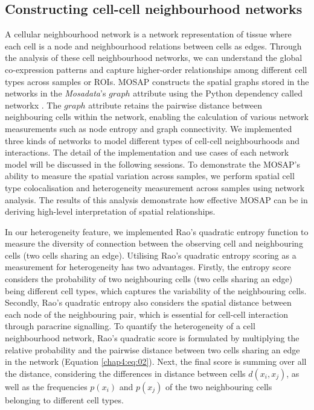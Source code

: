 \subsection{Constructing cell-cell neighbourhood networks}
A cellular neighbourhood network is a network representation of tissue where each cell is a node and neighbourhood relations between cells as edges. Through the analysis of these cell neighbourhood networks, we can understand the global co-expression patterns and capture higher-order relationships among different cell types across samples or ROIs. MOSAP constructs the spatial graphs stored in the networks in the \textit{Mosadata}'s $graph$ attribute using the Python dependency called networkx \cite{hagberg2008exploring}. The $graph$ attribute retains the pairwise distance between neighbouring cells within the network, enabling the calculation of various network measurements such as node entropy and graph connectivity. We implemented three kinds of networks to model different types of cell-cell neighbourhoods and interactions. The detail of the implementation and use cases of each network model will be discussed in the following sessions. To demonstrate the MOSAP's ability to measure the spatial variation across samples, we perform spatial cell type colocalisation and heterogeneity measurement across samples using network analysis. The results of this analysis demonstrate how effective MOSAP can be in deriving high-level interpretation of spatial relationships. 

In our heterogeneity feature, we implemented Rao’s quadratic entropy function to measure the diversity of connection between the observing cell and neighbouring cells (\ie two cells sharing an edge). Utilising Rao’s quadratic entropy scoring as a measurement for heterogeneity has two advantages. Firstly, the entropy score considers the probability of two neighbouring cells (\ie two cells sharing an edge) being different cell types, which captures the variability of the neighbouring cells. Secondly, Rao’s quadratic entropy also considers the spatial distance between each node of the neighbouring pair, which is essential for cell-cell interaction through paracrine signalling. To quantify the heterogeneity of a cell neighbourhood network, Rao's quadratic score is formulated by multiplying the relative probability and the pairwise distance between two cells sharing an edge in the network (Equation \ref{chap4:eq:02}). Next, the final score is summing over all the distance, considering the differences in distance between cells $d(x_i, x_j)$, as well as the frequencies $p(x_i)$ and $p(x_j)$ of the two neighbouring cells belonging to different cell types.      

